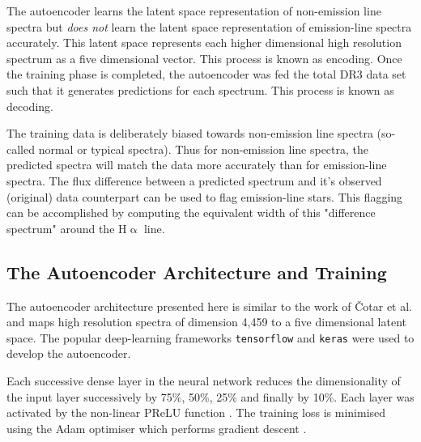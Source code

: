 The autoencoder learns the latent space representation of non-emission line spectra but \emph{does not} learn the latent space representation of emission-line spectra accurately. This latent space represents each higher dimensional high resolution spectrum as a five dimensional vector. This process is known as encoding. Once the training phase is completed, the autoencoder was fed the total DR3 data set such that it generates predictions for each spectrum. This process is known as decoding. 

The training data is deliberately biased towards non-emission line spectra (so-called normal or typical spectra). Thus for non-emission line spectra, the predicted spectra will match the data more accurately than for emission-line spectra. The flux difference between a predicted spectrum and it's observed (original) data counterpart can be used to flag emission-line stars. This flagging can be accomplished by computing the equivalent width of this "difference spectrum" around the H$\upalpha$ line.

\subsection{The Autoencoder Architecture and Training}

The autoencoder architecture presented here is similar to the work of Čotar et al. and maps high resolution spectra of dimension 4,459 to a five dimensional latent space. The popular deep-learning frameworks \texttt{tensorflow} \citep{tensorflow2015-whitepaper} and \texttt{keras} \citep{chollet2015keras} were used to develop the autoencoder.

Each successive dense layer in the neural network reduces the dimensionality of the input layer successively by 75\%, 50\%, 25\% and finally by 10\%. Each layer was activated by the non-linear PReLU function \citep{he2015delving}. The training loss is minimised using the Adam optimiser which performs gradient descent \citep{kingma2014adam}.

